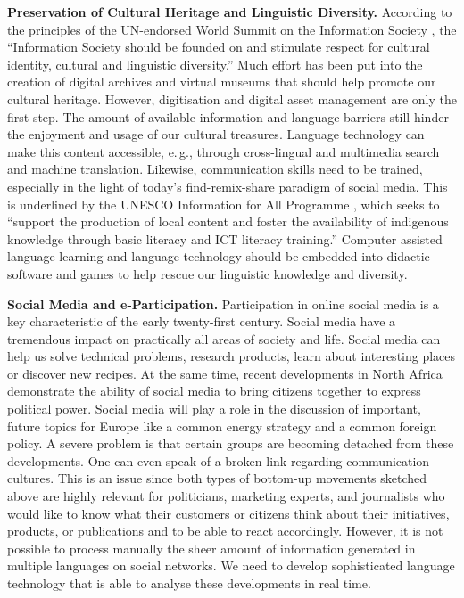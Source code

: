 \documentclass[10pt, plain]{../../metanetpaper}
\begin{document}
\begin{multicols}{2}
\textbf{Preservation of Cultural Heritage and Linguistic Diversity.} According to the principles of the UN-endorsed World Summit on the Information Society \cite{worldsummit2003}, the “Information Society should be founded on and stimulate respect for cultural identity, cultural and linguistic diversity.” Much effort has been put into the creation of digital archives and virtual museums that should help promote our cultural heritage. However, digitisation and digital asset management are only the first step. The amount of available information and language barriers still hinder the enjoyment and usage of our cultural treasures. Language technology can make this content accessible, e.\,g., through cross-lingual and multimedia search and machine translation. Likewise, communication skills need to be trained, especially in the light of today’s find-remix-share paradigm of social media. This is underlined by the UNESCO Information for All Programme \cite{Unesco2}, which seeks to “support the production of local content and foster the availability of indigenous knowledge through basic literacy and ICT literacy training.” Computer assisted language learning and language technology should be embedded into didactic software and games to help rescue our linguistic knowledge and diversity.

\textbf{Social Media and e-Participation.} Participation in online social media is a key characteristic of the early twenty-first century. Social media have a tremendous impact on practically all areas of society and life. Social media can help us solve technical problems, research products, learn about interesting places or discover new recipes. At the same time, recent developments in North Africa demonstrate the ability of social media to bring citizens together to express political power. Social media will play a role in the discussion of important, future topics for Europe like a common energy strategy and a common foreign policy.  A severe problem is that certain groups are becoming detached from these developments. One can even speak of a broken link regarding communication cultures. This is an issue since both types of bottom-up movements sketched above are highly relevant for politicians, marketing experts, and journalists who would like to know what their customers or citizens think about their initiatives, products, or publications and to be able to react accordingly. However, it is not possible to process manually the sheer amount of information generated in multiple languages on social networks. We need to develop sophisticated language technology that is able to analyse these developments in real time.


\end{multicols}
\end{document}
